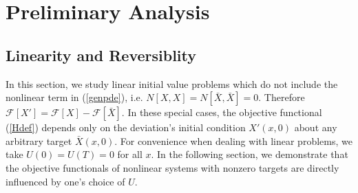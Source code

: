 \documentclass[longbibliography,amsmath,amssymb,aps,nofootinbib]{revtex4-2}
\begin{document}
\section{Preliminary Analysis}
\subsection{Linearity and Reversiblity}
In this section, we study linear initial value problems which do not include the nonlinear term in (\ref{genpde}), i.e. $N[X, X] = N[\bar{X}, \bar{X}] = 0$. Therefore $\mathcal{F}[X'] = \mathcal{F}[X] - \mathcal{F}[\bar{X}]$. 
In these special cases, the objective functional (\ref{Hdef}) depends only on the deviation's initial condition $X'(x, 0)$ about any arbitrary target $\bar{X}(x, 0)$.
For convenience when dealing with linear problems, we take $U(0) = U(T) = 0$ for all $x$.
In the following section, we demonstrate that the objective functionals of nonlinear systems with nonzero targets are directly influenced by one's choice of $U$.
\end{document}
